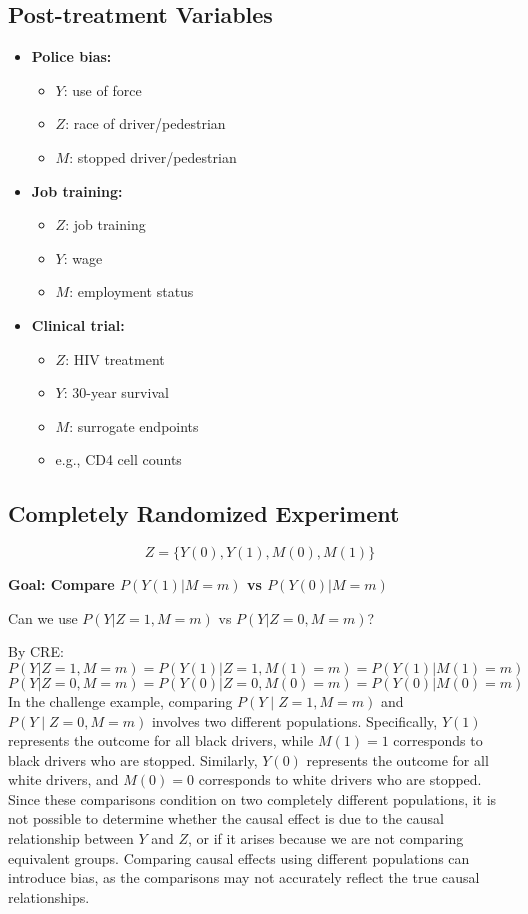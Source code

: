 \subsection*{Post-treatment Variables}
\begin{itemize}
    \item \textbf{Police bias:}
    \begin{itemize}
        \item $Y$: use of force
        \item $Z$: race of driver/pedestrian
        \item $M$: stopped driver/pedestrian
    \end{itemize}
    \item \textbf{Job training:}
    \begin{itemize}
        \item $Z$: job training
        \item $Y$: wage
        \item $M$: employment status
    \end{itemize}
    \item \textbf{Clinical trial:}
    \begin{itemize}
        \item $Z$: HIV treatment
        \item $Y$: 30-year survival
        \item $M$: surrogate endpoints
        \item e.g., CD4 cell counts
    \end{itemize}
\end{itemize}

\subsection*{Completely Randomized Experiment}
\[
Z = \{ Y(0), Y(1), M(0), M(1) \}
\]

\textbf{Goal: Compare $P(Y(1) | M = m)$ vs $P(Y(0) | M = m)$}

Can we use $P(Y|Z=1, M=m)$ vs $P(Y|Z=0, M=m)$?

By CRE:
\[
P(Y|Z=1, M=m) = P(Y(1)|Z=1, M(1) = m) = P(Y(1)| M(1) = m)
\]
\[
P(Y|Z=0, M=m) = P(Y(0)|Z=0, M(0) = m) = P(Y(0)| M(0) = m)
\]
In the challenge example, comparing \( P(Y \mid Z=1, M=m) \) and \( P(Y \mid Z=0, M=m) \) involves two different populations. Specifically, \( Y(1) \) represents the outcome for all black drivers, while \( M(1) = 1 \) corresponds to black drivers who are stopped. Similarly, \( Y(0) \) represents the outcome for all white drivers, and \( M(0) = 0 \) corresponds to white drivers who are stopped. Since these comparisons condition on two completely different populations, it is not possible to determine whether the causal effect is due to the causal relationship between \( Y \) and \( Z \), or if it arises because we are not comparing equivalent groups. Comparing causal effects using different populations can introduce bias, as the comparisons may not accurately reflect the true causal relationships.


